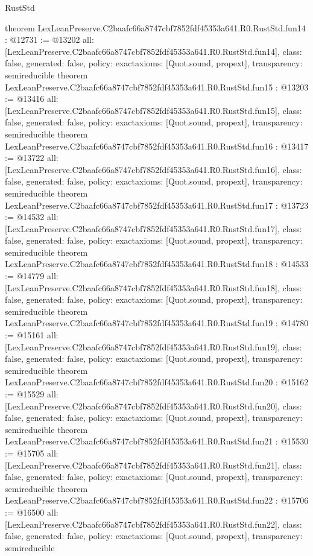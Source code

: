 \begin{lexlean}{RustStd}
\begin{coremodule}
{}
theorem LexLeanPreserve.C2baafc66a8747cbf7852fdf45353a641.R0.RustStd.fun14 : @12731 := @13202 {
  all: [LexLeanPreserve.C2baafc66a8747cbf7852fdf45353a641.R0.RustStd.fun14],
  class: false,
  generated: false,
  policy: exact{axioms: [Quot.sound, propext]},
  transparency: semireducible
}
theorem LexLeanPreserve.C2baafc66a8747cbf7852fdf45353a641.R0.RustStd.fun15 : @13203 := @13416 {
  all: [LexLeanPreserve.C2baafc66a8747cbf7852fdf45353a641.R0.RustStd.fun15],
  class: false,
  generated: false,
  policy: exact{axioms: [Quot.sound, propext]},
  transparency: semireducible
}
theorem LexLeanPreserve.C2baafc66a8747cbf7852fdf45353a641.R0.RustStd.fun16 : @13417 := @13722 {
  all: [LexLeanPreserve.C2baafc66a8747cbf7852fdf45353a641.R0.RustStd.fun16],
  class: false,
  generated: false,
  policy: exact{axioms: [Quot.sound, propext]},
  transparency: semireducible
}
theorem LexLeanPreserve.C2baafc66a8747cbf7852fdf45353a641.R0.RustStd.fun17 : @13723 := @14532 {
  all: [LexLeanPreserve.C2baafc66a8747cbf7852fdf45353a641.R0.RustStd.fun17],
  class: false,
  generated: false,
  policy: exact{axioms: [Quot.sound, propext]},
  transparency: semireducible
}
theorem LexLeanPreserve.C2baafc66a8747cbf7852fdf45353a641.R0.RustStd.fun18 : @14533 := @14779 {
  all: [LexLeanPreserve.C2baafc66a8747cbf7852fdf45353a641.R0.RustStd.fun18],
  class: false,
  generated: false,
  policy: exact{axioms: [Quot.sound, propext]},
  transparency: semireducible
}
theorem LexLeanPreserve.C2baafc66a8747cbf7852fdf45353a641.R0.RustStd.fun19 : @14780 := @15161 {
  all: [LexLeanPreserve.C2baafc66a8747cbf7852fdf45353a641.R0.RustStd.fun19],
  class: false,
  generated: false,
  policy: exact{axioms: [Quot.sound, propext]},
  transparency: semireducible
}
theorem LexLeanPreserve.C2baafc66a8747cbf7852fdf45353a641.R0.RustStd.fun20 : @15162 := @15529 {
  all: [LexLeanPreserve.C2baafc66a8747cbf7852fdf45353a641.R0.RustStd.fun20],
  class: false,
  generated: false,
  policy: exact{axioms: [Quot.sound, propext]},
  transparency: semireducible
}
theorem LexLeanPreserve.C2baafc66a8747cbf7852fdf45353a641.R0.RustStd.fun21 : @15530 := @15705 {
  all: [LexLeanPreserve.C2baafc66a8747cbf7852fdf45353a641.R0.RustStd.fun21],
  class: false,
  generated: false,
  policy: exact{axioms: [Quot.sound, propext]},
  transparency: semireducible
}
theorem LexLeanPreserve.C2baafc66a8747cbf7852fdf45353a641.R0.RustStd.fun22 : @15706 := @16500 {
  all: [LexLeanPreserve.C2baafc66a8747cbf7852fdf45353a641.R0.RustStd.fun22],
  class: false,
  generated: false,
  policy: exact{axioms: [Quot.sound, propext]},
  transparency: semireducible
}
\end{coremodule}
\end{lexlean}
